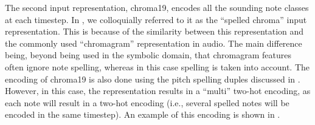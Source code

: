 
The second input representation, \gls{chroma19}, encodes all
the sounding note classes at each timestep. In
\textcite{napoleslopez2021augmentednet}, we colloquially
referred to it as the ``spelled chroma'' input
representation. This is because of the similarity between
this representation and the commonly used ``chromagram''
representation in audio. The main difference being, beyond
being used in the symbolic domain, that chromagram features
often ignore note spelling, whereas in this case spelling is
taken into account. The encoding of \gls{chroma19} is also
done using the pitch spelling duples discussed in
. However, in this case, the
representation results in a ``multi'' two-hot encoding, as
each note will result in a two-hot encoding (i.e., several
spelled notes will be encoded in the same timestep). An
example of this encoding is shown in
.

